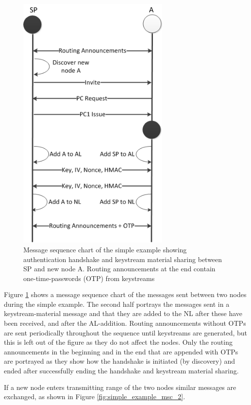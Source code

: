 \begin{figure}[ht]
	\centering
  	\includegraphics[height=13cm]{images/simple_example_msc.png}
  	\caption{Message sequence chart of the simple example showing authentication
  	  handshake and keystream material sharing between SP and new node A. Routing
  	  announcements at the end contain one-time-passwords (OTP) from keystreams}
	\label{fig:simple_example_msc}
\end{figure}

Figure \ref{fig:simple_example_msc} shows a message sequence chart of the
messages sent between two nodes during the simple example. The second
half portrays the messages sent in a keystream-material message and that
they are added to the \ac{NL} after these have been received, and after
the \ac{AL}-addition. Routing announcements without \aclp{OTP} are sent
periodically throughout the sequence until keystreams are generated, but this
is left out of the figure as they do not affect the nodes. Only the routing
announcements in the beginning and in the end that are appended with \acp{OTP}
are portrayed as they show how the handshake is initiated (by discovery) and
ended after successfully ending the handshake and keystream material sharing.

If a new node enters transmitting range of the two nodes similar messages are
exchanged, as shown in Figure \ref{fig:simple_example_msc_2}.


